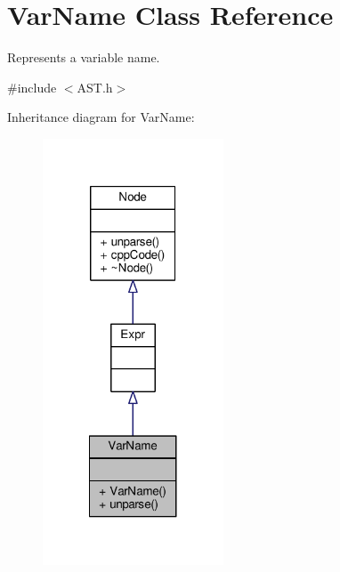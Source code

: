 \hypertarget{classVarName}{\section{Var\-Name Class Reference}
\label{classVarName}
}


Represents a variable name. \par
  




{\ttfamily \#include $<$A\-S\-T.\-h$>$}



Inheritance diagram for Var\-Name\-:\nopagebreak
\begin{figure}[H]
\begin{center}
\leavevmode
\includegraphics[width=152pt]{classVarName__inherit__graph}
\end{center}
\end{figure}


